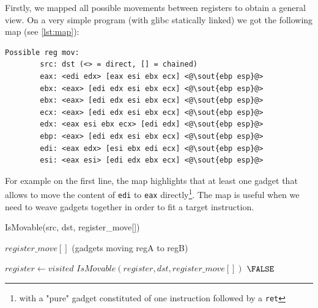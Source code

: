 \documentclass[10pt,twocolumn]{article}
\begin{document}
Firstly, we mapped all possible movements between registers to obtain a general
view. On a very simple program (with glibc statically linked) we got the
following map (see \autoref{lst:map}):

\begin{lstlisting}[float=h,aboveskip=\medskipamount,belowskip=0pt,caption=Map
of movement between registers,label=lst:map]
Possible reg mov:
        src: dst (<> = direct, [] = chained)
        eax: <edi edx> [eax esi ebx ecx] <@\sout{ebp esp}@>
        ebx: <eax> [edi edx esi ebx ecx] <@\sout{ebp esp}@>
        ebx: <eax> [edi edx esi ebx ecx] <@\sout{ebp esp}@>
        ecx: <eax> [edi edx esi ebx ecx] <@\sout{ebp esp}@>
        edx: <eax esi ebx ecx> [edi edx] <@\sout{ebp esp}@>
        ebp: <eax> [edi edx esi ebx ecx] <@\sout{ebp esp}@>
        edi: <eax edx> [esi ebx edi ecx] <@\sout{ebp esp}@>
        esi: <eax esi> [edi edx ebx ecx] <@\sout{ebp esp}@>
\end{lstlisting}

For example on the first line, the map highlights that at least one gadget that
allows to move the content of \texttt{edi} to \texttt{eax}
directly\footnote{with a "pure" gadget constituted of one instruction followed
by a \texttt{ret}}. The map is useful when we need to weave gadgets together
in order to fit a target instruction.

\begin{algorithm}
    \caption{IsMovable(src, dst, register\_move[])}
    \label{alg:is_movable}
    \begin{algorithmic}[1]
        \REQUIRE $register\_move[]$ (gadgets moving regA to regB)

                        \RETURN \TRUE
                        \ENDIF
                    \ENDIF
                \ENDFOR
            \ENDIF
        \ENDFOR

                \STATE $register \leftarrow visited$
                        \RETURN $IsMovable(register, dst, register\_move[])$
                        \ENDIF
                    \ENDIF
                \ENDFOR
            \ENDIF
        \ENDFOR
        \RETURN $\FALSE$

    \end{algorithmic}
\end{algorithm}
\end{document}
